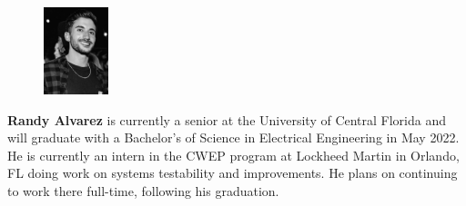 \documentclass[conference]{IEEEtran}
\begin{document}
\begin{figure}
\centering
\includegraphics[height=1in]{img/Randy.png}
\end{figure}
\textbf{Randy Alvarez} is currently a senior at the University of Central Florida and will graduate with a Bachelor's of Science in Electrical Engineering in May 2022. He is currently an intern in the CWEP program at Lockheed Martin in Orlando, FL doing work on systems testability and improvements. He plans on continuing to work there full-time, following his graduation. \\
\end{document}
